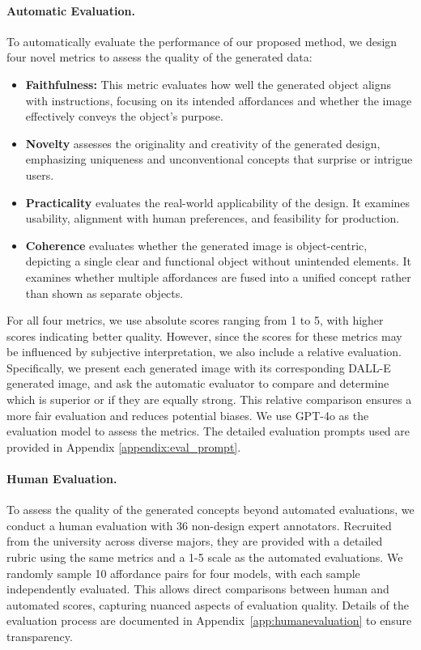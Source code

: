 \paragraph{Automatic Evaluation.}
To automatically evaluate the performance of our proposed method, we design four novel metrics to assess the quality of the generated data:
\begin{itemize}
    \item \textbf{Faithfulness:} This metric evaluates how well the generated object aligns with instructions, focusing on its intended affordances and whether the image effectively conveys the object's purpose.
    \vspace{-0.05in}
    \item \textbf{Novelty} assesses the originality and creativity of the generated design, emphasizing uniqueness and unconventional concepts that surprise or intrigue users.
    \item \textbf{Practicality} evaluates the real-world applicability of the design. It examines usability, alignment with human preferences, and feasibility for production.
    \item \textbf{Coherence} evaluates whether the generated image is object-centric, depicting a single clear and functional object without unintended elements. It examines whether multiple affordances are fused into a unified concept rather than shown as separate objects.
\end{itemize}

For all four metrics, we use absolute scores ranging from 1 to 5, with higher scores indicating better quality. However, since the scores for these metrics may be influenced by subjective interpretation, we also include a relative evaluation. Specifically, we present each generated image with its corresponding DALL-E generated image, and ask the automatic evaluator to compare and determine which is superior or if they are equally strong. This relative comparison ensures a more fair evaluation and reduces potential biases.
We use GPT-4o \citep{openai2024gpt4ocard} as the evaluation model to assess the metrics. The detailed evaluation prompts used are provided in Appendix \ref{appendix:eval_prompt}.
\paragraph{Human Evaluation.}
To assess the quality of the generated concepts beyond automated evaluations, we conduct a human evaluation with 36 non-design expert annotators. Recruited from the university across diverse majors, they are provided with a detailed rubric using the same metrics and a 1-5 scale as the automated evaluations. We randomly sample 10 affordance pairs for four models, with each sample independently evaluated. This allows direct comparisons between human and automated scores, capturing nuanced aspects of evaluation quality. Details of the evaluation process are documented in Appendix~\ref{app:humanevaluation} to ensure transparency.


